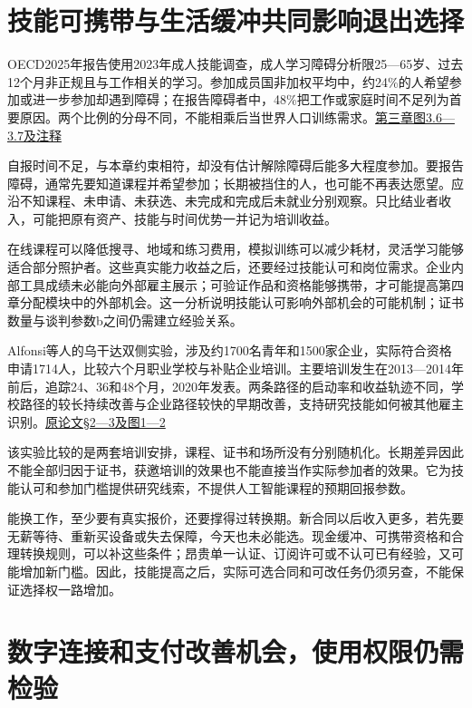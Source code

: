 \documentclass[UTF8,fontset=windows,12pt,a4paper,oneside,openany]{ctexbook}
\begin{document}
\section{技能可携带与生活缓冲共同影响退出选择}

OECD2025年报告使用2023年成人技能调查，成人学习障碍分析限25—65岁、过去12个月非正规且与工作相关的学习。参加成员国非加权平均中，约24\%的人希望参加或进一步参加却遇到障碍；在报告障碍者中，48\%把工作或家庭时间不足列为首要原因。两个比例的分母不同，不能相乘后当世界人口训练需求。\href{https://www.oecd.org/en/publications/trends-in-adult-learning_ec0624a6-en/full-report/why-is-participation-not-more-common_73893b53.html}{第三章图3.6—3.7及注释}

自报时间不足，与本章约束相符，却没有估计解除障碍后能多大程度参加。要报告障碍，通常先要知道课程并希望参加；长期被挡住的人，也可能不再表达愿望。应沿不知课程、未申请、未获选、未完成和完成后未就业分别观察。只比结业者收入，可能把原有资产、技能与时间优势一并记为培训收益。

在线课程可以降低搜寻、地域和练习费用，模拟训练可以减少耗材，灵活学习能够适合部分照护者。这些真实能力收益之后，还要经过技能认可和岗位需求。企业内部工具成绩未必能向外部雇主展示；可验证作品和资格能够携带，才可能提高第四章分配模块中的外部机会。这一分析说明技能认可影响外部机会的可能机制；证书数量与谈判参数b之间仍需建立经验关系。

Alfonsi等人的乌干达双侧实验，涉及约1700名青年和1500家企业，实际符合资格申请1714人，比较六个月职业学校与补贴企业培训。主要培训发生在2013—2014年前后，追踪24、36和48个月，2020年发表。两条路径的启动率和收益轨迹不同，学校路径的较长持续改善与企业路径较快的早期改善，支持研究技能如何被其他雇主识别。\href{https://www.lse.ac.uk/economics/Assets/Documents/personal-pages/robin-burgess/tackling-youth-unemployment.pdf}{原论文§2—3及图1—2}

该实验比较的是两套培训安排，课程、证书和场所没有分别随机化。长期差异因此不能全部归因于证书，获邀培训的效果也不能直接当作实际参加者的效果。它为技能认可和参加门槛提供研究线索，不提供人工智能课程的预期回报参数。

能换工作，至少要有真实报价，还要撑得过转换期。新合同以后收入更多，若先要无薪等待、重新买设备或失去保障，今天也未必能选。现金缓冲、可携带资格和合理转换规则，可以补这些条件；昂贵单一认证、订阅许可或不认可已有经验，又可能增加新门槛。因此，技能提高之后，实际可选合同和可改任务仍须另查，不能保证选择权一路增加。

\section{数字连接和支付改善机会，使用权限仍需检验}
\end{document}
